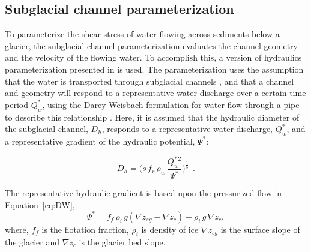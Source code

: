 \documentclass[11pt]{article}
\begin{document}
\begin{spacing}{1}
  \subsection{Subglacial channel  parameterization}
  \label{sect:sub_mode}
  To parameterize the shear stress of water flowing across sediments below a glacier, the subglacial channel parameterization evaluates the channel geometry and the velocity of the flowing water. 
  To accomplish this,  a version of hydraulics parameterization presented in \citet{delaney2019} is used.
  The parameterization uses the assumption that the water is transported through subglacial channels \citep[Figure~\ref{fig:cartoon}; ][]{rothlisberger1972}, and that a channel and geometry will respond to a representative water discharge over a certain time period $Q_{w}^*$, using the Darcy-Weisbach formulation for water-flow through a pipe to describe this relationship \citep[e.g.][]{rothlisberger1972,clarke2003,werder2013}.
  Here, it is assumed that the hydraulic diameter of the subglacial channel, $D_h$, responds to a representative water discharge, $Q_{w}^*$, and a representative gradient of the hydraulic potential, $\Psi^*$:
  \begin{linenomath*}
    \begin{equation}
      \label{eq:DW}
      D_h = \big(s\, f_r\,\rho_w\, \frac{Q_w^{*\,2}}{\Psi^*}\big)^{\frac{1}{5}}~~.
    \end{equation}
  \end{linenomath*}
  The representative hydraulic gradient is based upon the pressurized flow in Equation~\ref{eq:DW},
  \begin{equation}
    \label{eq:psi}
    \Psi^*= f_f \,  \rho_i \, g (\nabla z_{sg} - \nabla z_c) +  \rho_i \, g \, \nabla z_c,
  \end{equation}
  \noindent
  where, $f_f$ is the flotation fraction, $\rho_i$ is density of ice $\nabla z_{sg}$ is the surface slope of the glacier and $\nabla z_{c}$ is the glacier bed slope.
  

\end{spacing}
\end{document}
